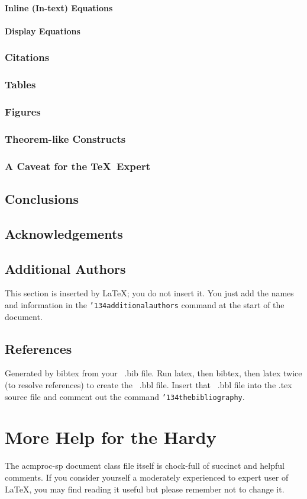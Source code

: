\documentclass{sigkddExp}
\begin{document}
\paragraph{Inline (In-text) Equations}
\paragraph{Display Equations}
\subsubsection{Citations}
\subsubsection{Tables}
\subsubsection{Figures}
\subsubsection{Theorem-like Constructs}
\subsubsection*{A Caveat for the \TeX\ Expert}
\subsection{Conclusions}
\subsection{Acknowledgements}
\subsection{Additional Authors}
This section is inserted by \LaTeX; you do not insert it.
You just add the names and information in the
\texttt{{\char'134}additionalauthors} command at the start
of the document.
\subsection{References}
Generated by bibtex from your ~.bib file.  Run latex,
then bibtex, then latex twice (to resolve references)
to create the ~.bbl file.  Insert that ~.bbl file into
the .tex source file and comment out
the command \texttt{{\char'134}thebibliography}.
\section{More Help for the Hardy}
The acmproc-sp document class file itself is chock-full of succinct
and helpful comments.  If you consider yourself a moderately
experienced to expert user of \LaTeX, you may find reading
it useful but please remember not to change it.

\end{document}
